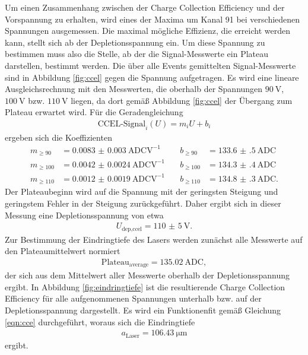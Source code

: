 Um einen Zusammenhang zwischen der Charge Collection Efficiency und der Vorspannung zu erhalten,
wird eines der Maxima um Kanal 91 bei verschiedenen Spannungen ausgemessen. Die maximal mögliche Effizienz,
die erreicht werden kann, stellt sich ab der Depletionsspannung ein. Um diese Spannung zu bestimmen muss also
die Stelle, ab der die Signal-Messwerte ein Plateau darstellen, bestimmt werden. Die über alle Events gemittelten
Signal-Messwerte sind in Abbildung \ref{fig:ccel} gegen die Spannung aufgetragen. Es wird eine lineare Ausgleichsrechnung
mit den Messwerten, die oberhalb der Spannungen $\SI{90}{\volt}$, $\SI{100}{\volt}$ bzw. $\SI{110}{\volt}$ liegen, da dort gemäß Abbildung \ref{fig:ccel}
der Übergang zum Plateau erwartet wird.
Für die Geradengleichung
\begin{align}
  \text{CCEL-Signal}_i(U) = m_i U + b_i
\end{align}
ergeben sich die Koeffizienten
\begin{align*}
  m_{\geq90}  &= \SI{0.0083(30)}{\text{ADC}\volt\tothe{-1}} &\quad b_{\geq90}  &= \SI{133.6(5)}{\text{ADC}} \\
  m_{\geq100} &= \SI{0.0042(24)}{\text{ADC}\volt\tothe{-1}} &\quad b_{\geq100} &= \SI{134.3(4)}{\text{ADC}} \\
  m_{\geq110} &= \SI{0.0012(19)}{\text{ADC}\volt\tothe{-1}} &\quad b_{\geq110} &= \SI{134.8(3)}{\text{ADC}}.
\end{align*}
Der Plateaubeginn wird auf die Spannung mit der geringsten Steigung und geringstem Fehler in der Steigung zurückgeführt.
Daher ergibt sich in dieser Messung eine Depletionsspannung von etwa
\begin{align}
  U_\text{dep,ccel} = \SI{110(5)}{\volt}.
\end{align}
Zur Bestimmung der Eindringtiefe des Lasers werden zunächst alle Messwerte auf den Plateaumittelwert normiert
\begin{align}
  \text{Plateau}_\text{average} = \SI{135.02}{\text{ADC}},
\end{align}
der sich aus dem Mittelwert aller Messwerte oberhalb der Depletionsspannung ergibt.
In Abbildung \ref{fig:eindringtiefe} ist die resultierende Charge Collection Efficiency für alle aufgenommenen Spannungen unterhalb bzw.
auf der Depletionsspannung dargestellt. Es wird ein Funktionenfit gemäß Gleichung \eqref{eqn:cce} durchgeführt, woraus sich
die Eindringtiefe
\begin{align}
  a_\text{Laser} = \SI{106.43}{\micro\meter}
\end{align}
ergibt.

